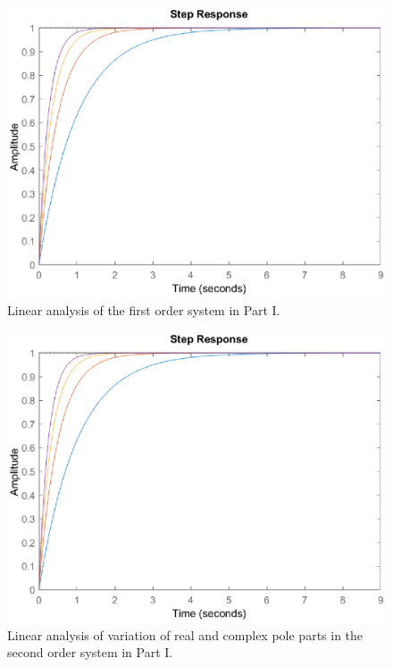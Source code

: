 \documentclass[11pt]{article}
\begin{document}
\begin{figure}
    \centering
    \includegraphics[width=0.75\linewidth]{lab0405/fig/lti-0101-first_order.eps}
    \caption{Linear analysis of the first order system in Part I.}
    \label{fig:lti part 01 first order}
\end{figure}

\begin{figure}
    \centering
    \includegraphics[width=0.75\linewidth]{lab0405/fig/lti-0101-first_order.eps}
    \caption{Linear analysis of variation of real and complex pole parts in the second order system in Part I.}
    \label{fig:lti part 01 real}
\end{figure}
\end{document}
